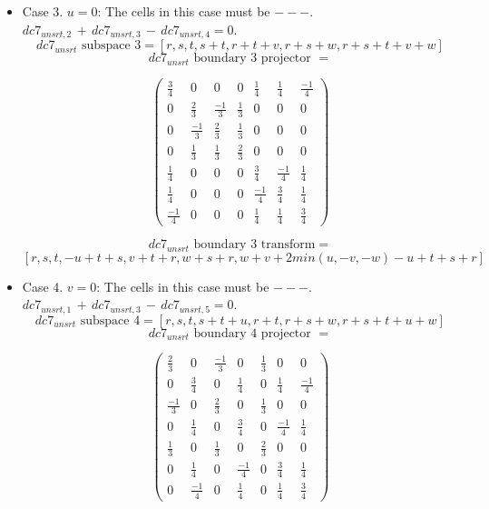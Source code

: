 \documentclass[preprint]{iucr}              %
\begin{document}
{ \begin{itemize}
     \item{Case 3. $u=0$:  The cells in this case must be $---$.\\
     $dc7_{unsrt,2}\,+\,dc7_{unsrt,3}\,-\,dc7_{unsrt,4}=0$.
     \[dc7_{unsrt}  \text{ subspace 3}=[r,s,t,s+t,r+t+v,r+s+w,r+s+t+v+w]\]
     \[dc7_{unsrt} \text{ boundary 3 projector } =\]
\begin{center}
\begin{equation*}
\begin{pmatrix}
\frac{3}{4}&0&0&0&\frac{1}{4}&\frac{1}{4}&\frac{-1}{4}\\[.25em]
0&\frac{2}{3}&\frac{-1}{3}&\frac{1}{3}&0&0&0\\[.25em]
0&\frac{-1}{3}&\frac{2}{3}&\frac{1}{3}&0&0&0\\[.25em]
0&\frac{1}{3}&\frac{1}{3}&\frac{2}{3}&0&0&0\\[.25em]
\frac{1}{4}&0&0&0&\frac{3}{4}&\frac{-1}{4}&\frac{1}{4}\\[.25em]
\frac{1}{4}&0&0&0&\frac{-1}{4}&\frac{3}{4}&\frac{1}{4}\\[.25em]
\frac{-1}{4}&0&0&0&\frac{1}{4}&\frac{1}{4}&\frac{3}{4}
\end{pmatrix}
\end{equation*}
\end{center}

     \[dc7_{unsrt} \text{ boundary 3 transform}=\]
     \[ [r,s,t,-u+t+s,v+t+r,w+s+r,w+v+2 min(u,-v,-w)-u+t+s+r]\]
     }
     \item{Case 4. $v=0$:  The cells in this case must be $---$.\\
     $dc7_{unsrt,1}\,+\,dc7_{unsrt,3}\,-\,dc7_{unsrt,5}=0$.
     \[dc7_{unsrt} \text{ subspace 4}=[r,s,t,s+t+u,r+t,r+s+w, r+s+t+u+w]\]
     \[dc7_{unsrt} \text{ boundary 4 projector } =\]
\begin{center}
\begin{equation*}
\begin{pmatrix}
\frac{2}{3}&0&\frac{-1}{3}&0&\frac{1}{3}&0&0\\[.25em]
0&\frac{3}{4}&0&\frac{1}{4}&0&\frac{1}{4}&\frac{-1}{4}\\[.25em]
\frac{-1}{3}&0&\frac{2}{3}&0&\frac{1}{3}&0&0\\[.25em]
0&\frac{1}{4}&0&\frac{3}{4}&0&\frac{-1}{4}&\frac{1}{4}\\[.25em]
\frac{1}{3}&0&\frac{1}{3}&0&\frac{2}{3}&0&0\\[.25em]
0&\frac{1}{4}&0&\frac{-1}{4}&0&\frac{3}{4}&\frac{1}{4}\\[.25em]
0&\frac{-1}{4}&0&\frac{1}{4}&0&\frac{1}{4}&\frac{3}{4}
\end{pmatrix}
\end{equation*}
\end{center}

}
\end{itemize}}
\end{document}

